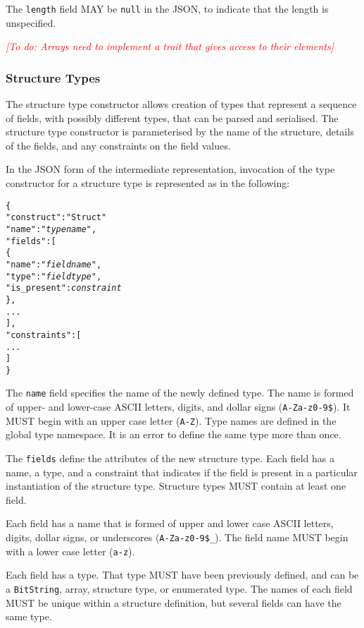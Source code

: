 \documentclass[10pt,twocolumn,a4paper]{article}
\newcommand{\todo}[1]{\textit{\textcolor{red}{[To do: #1]}}}
\newcommand{\code}[1]{\texttt{#1}}
\begin{document}
The \code{length} field MAY be \code{null} in the JSON, to indicate that
the length is unspecified.

\todo{Arrays need to implement a trait that gives access to their elements}

\subsubsection{Structure Types}

The structure type constructor allows creation of types that represent a
sequence of fields, with possibly different types, that can be parsed and
serialised. The structure type constructor is parameterised by the name of
the structure, details of the fields, and any constraints on the field
values.

In the JSON form of the intermediate representation, invocation of the type
constructor for a structure type is represented as in the following:
\footnotesize
\begin{alltt}
  \{
    "construct"   : "Struct"
    "name"        : "\emph{type name}",
    "fields"      : [
      \{
        "name"       : "\emph{field name}",
        "type"       : "\emph{field type}",
        "is\_present" : \emph{constraint}
      \},
      ...
    ],
    "constraints" : [
      ...
    ]
  \}
\end{alltt}
\normalsize
The \code{name} field specifies the name of the newly defined type. The
name is formed of upper- and lower-case ASCII letters, digits, and dollar
signs (\code{A-Za-z0-9\$}).  It MUST begin with an upper case letter
(\code{A-Z}). Type names are defined in the global type namespace.
It is an error to define the same type more than once.

The \code{fields} define the attributes of the new structure type. Each
field has a name, a type, and a constraint that indicates if the field is
present in a particular instantiation of the structure type. Structure
types MUST contain at least one field.

Each field has a name that is formed of upper and lower case ASCII letters,
digits, dollar signs, or underscores (\code{A-Za-z0-9\$\_}). The field name
MUST begin with a lower case letter (\code{a-z}).

Each field has a type. That type MUST have been previously defined, and can
be a \code{BitString}, array, structure type, or enumerated type. The names
of each field MUST be unique within a structure definition, but several
fields can have the same type.
\end{document}
